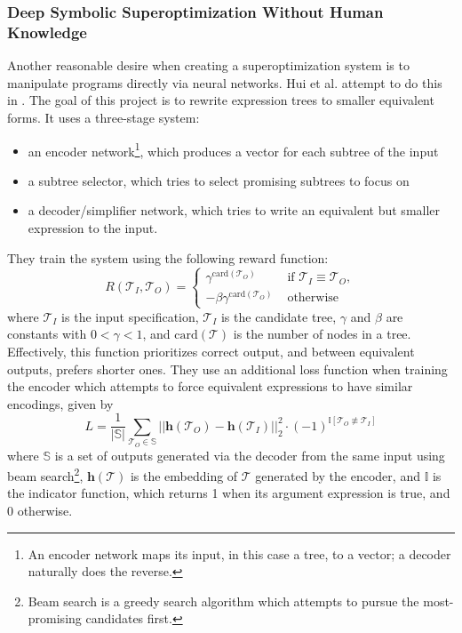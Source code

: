 \documentclass[12pt,twoside]{reedthesis}
\begin{document}
\subsubsection{Deep Symbolic Superoptimization Without Human Knowledge}
Another reasonable desire when creating a superoptimization system is to manipulate programs directly via neural networks.
Hui et al. attempt to do this in \cite{hui2020deep}. 
The goal of this project is to rewrite expression trees to smaller equivalent forms. 
It uses a three-stage system:
\begin{itemize}
    \item an encoder network\footnote{An encoder network maps its input, in this case a tree, to a vector; a decoder naturally does the reverse.}, which produces a vector for each subtree of the input
    \item a subtree selector, which tries to select promising subtrees to focus on
    \item a decoder/simplifier network, which tries to write an equivalent but smaller expression to the input.
\end{itemize}
    
They train the system using the following reward function:
\[
    R(\mathcal{T}_I,\mathcal{T}_O) =
        \begin{cases}
            \gamma^{\text{card}(\mathcal{T}_O)} & \text{ if } \mathcal{T}_I \equiv \mathcal{T}_O,
         \\ -\beta\gamma^{\text{card}(\mathcal{T}_O)} & \text{ otherwise}
        \end{cases}
\]
where $\mathcal{T}_I$ is the input specification, $\mathcal{T}_I$ is the candidate tree, $\gamma$ and $\beta$ are constants with $0 < \gamma < 1$, and $\text{card}(\mathcal{T})$ is the number of nodes in a tree.
Effectively, this function prioritizes correct output, and between equivalent outputs, prefers shorter ones.
They use an additional loss function when training the encoder which attempts to force equivalent expressions to have similar encodings, given by
\[
    L = \frac{1}{|\mathbb{S}|} \sum_{\mathcal{T}_O \in \mathbb{S}} || \boldsymbol{h}(\mathcal{T}_O) - \boldsymbol{h}(\mathcal{T}_I) ||^2_2 \cdot (-1)^{\mathbb{I}[\mathcal{T}_O \not\equiv \mathcal{T}_I]}
\]
where $\mathbb{S}$ is a set of outputs generated via the decoder from the same input using beam search\footnote{Beam search is a greedy search algorithm which attempts to pursue the most-promising candidates first.}, $\boldsymbol{h}(\mathcal{T})$ is the embedding of $\mathcal{T}$ generated by the encoder, and $\mathbb{I}$ is the indicator function, which returns 1 when its argument expression is true, and 0 otherwise.
\end{document}
